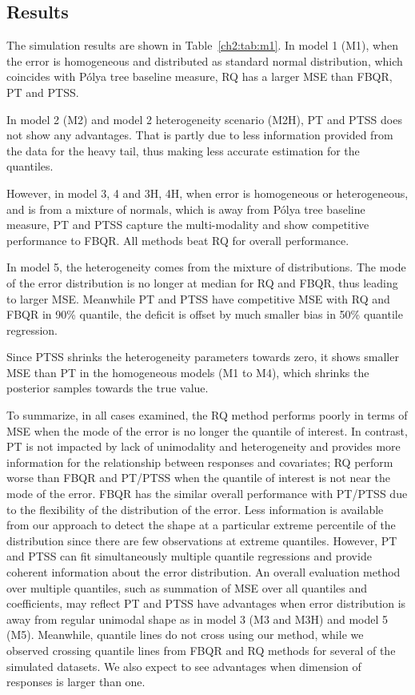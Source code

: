 \documentclass[12pt]{article}
\newcommand{\polya}{P\'{o}lya}
\begin{document}
\subsection{Results}
The simulation results are shown in Table~\ref{ch2:tab:m1}.
In model 1 (M1), when the error is homogeneous and distributed as standard normal distribution, which coincides with \polya{} tree baseline measure, RQ has a larger MSE than FBQR, PT and PTSS.

In model 2 (M2) and model 2 heterogeneity scenario (M2H), PT and PTSS does not show any advantages.
That is partly due to less information provided from the data for the heavy tail, thus making less accurate estimation for the quantiles.

However, in model 3, 4 and 3H, 4H, when error is homogeneous or heterogeneous, and is from a mixture of normals, which is away from \polya{} tree baseline measure,
PT and PTSS capture the multi-modality and show competitive performance to FBQR.  All methods beat RQ for overall performance.

In model 5, the heterogeneity comes from the mixture of distributions.
The mode of the error distribution is no longer at median for RQ and FBQR, thus leading to larger MSE.
Meanwhile PT and PTSS have competitive MSE with RQ and FBQR in 90\% quantile, the deficit is offset by much smaller bias in 50\% quantile regression.

Since PTSS shrinks the heterogeneity parameters towards zero, it shows smaller MSE than PT in the homogeneous models (M1 to M4), which shrinks the posterior samples towards the true value.

To summarize, in all cases examined, the RQ method performs poorly in terms of MSE when the mode of the error is no longer the quantile of interest.
In contrast, PT is not impacted by lack of unimodality and heterogeneity and provides more information for the relationship between responses and covariates;
RQ perform worse than FBQR and PT/PTSS when the quantile of interest is not near the mode of the error.
FBQR has the similar overall performance with PT/PTSS due to the flexibility of the distribution of the error.
Less information is available from our approach to detect the shape at a particular extreme percentile of the distribution since there are few observations at extreme quantiles.
However, PT and PTSS can fit simultaneously multiple quantile regressions and provide coherent information about the error distribution.
An overall evaluation method over multiple quantiles, such as summation of MSE over all quantiles and coefficients, may reflect PT and PTSS have advantages when error distribution is away from regular unimodal shape as in model 3 (M3 and M3H) and model 5 (M5).
Meanwhile, quantile lines do not cross using our method, while we observed crossing quantile lines from FBQR and RQ methods for several of the simulated datasets.
We also expect to see advantages when dimension of responses is larger than one.
\end{document}

